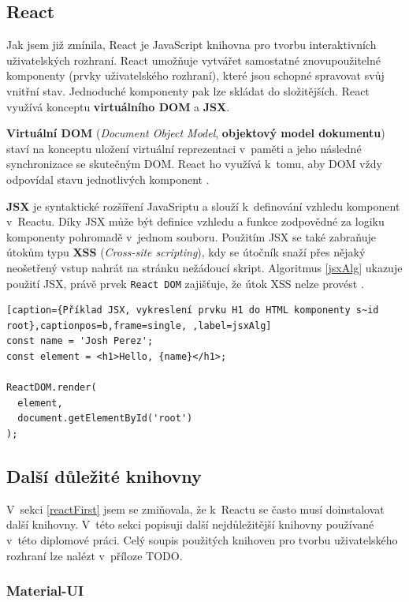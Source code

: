 \subsection{React}

Jak jsem již zmínila, React je JavaScript knihovna pro tvorbu interaktivních uživatelských rozhraní. React umožňuje vytvářet samostatné znovupoužitelné komponenty (prvky uživatelského rozhraní), které jsou schopné spravovat svůj vnitřní stav. Jednoduché komponenty pak lze skládat do složitějších. React využívá konceptu \textbf{virtuálního DOM} a \textbf{JSX}. 

\textbf{Virtuální DOM} (\textit{Document Object Model}, \textbf{objektový model dokumentu}) staví na konceptu uložení virtuální reprezentaci v~paměti a jeho následné synchronizace se skutečným DOM. React ho využívá k~tomu, aby DOM vždy odpovídal stavu jednotlivých komponent \cite{VDOM}.

\textbf{JSX} je syntaktické rozšíření JavaSriptu a slouží k~definování vzhledu komponent v~Reactu. Díky JSX může být definice vzhledu a funkce zodpovědné za logiku komponenty pohromadě v~jednom souboru. Použitím JSX se také zabraňuje útokům typu \textbf{XSS} (\textit{Cross-site scripting}), kdy se útočník snaží přes nějaký neošetřený vstup nahrát na stránku nežádoucí skript. Algoritmus \ref{jsxAlg} ukazuje použití JSX, právě prvek \texttt{React DOM} zajišťuje, že útok XSS nelze provést \cite{JSX}.

\begin{lstlisting}[caption={Příklad JSX, vykreslení prvku H1 do HTML komponenty s~id root},captionpos=b,frame=single, ,label=jsxAlg]
const name = 'Josh Perez';
const element = <h1>Hello, {name}</h1>;

ReactDOM.render(
  element,
  document.getElementById('root')
);
\end{lstlisting}

\subsection{Další důležité knihovny}

V~sekci \ref{reactFirst} jsem se zmiňovala, že k~Reactu se často musí doinstalovat další knihovny. V~této sekci popisuji další nejdůležitější knihovny používané v~této diplomové práci. Celý soupis použitých knihoven pro tvorbu uživatelského rozhraní lze nalézt v~příloze TODO.

\subsubsection *{Material-UI}

